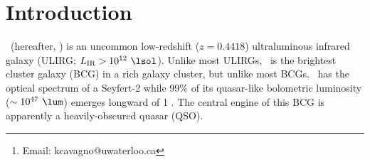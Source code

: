 \documentclass[useAMS,usenatbib]{mn2e}
\title[\mystitle]{\mytitle}
\author[Cavagnolo et al.]{K. W. Cavagnolo$^{1,2}$\thanks{Email:
    kcavagno@uwaterloo.ca}, M. Donahue$^{2}$, G. M. Voit$^{2}$,
  B. R. McNamara$^{1,3,4}$, and M. Sun$^{5}$\\
  $^{1}$University of Waterloo, Waterloo, ON, N2L 3G1, Canada.\\
  $^{2}$Michigan State University, East Lansing, MI, 48824, USA.\\
  $^{3}$Perimeter Institute for Theoretical Physics, 31 Caroline St. N., Waterloo, ON, N2L 2Y5, Canada.\\
  $^{4}$Harvard-Smithsonian Center for Astrophysics, 60 Garden Street, Cambridge, MA, 02138, USA.\\
  $^{5}$University of Virginia, Charlottesville, VA, 22904, USA.}
\begin{document}
\date{Accepted (2010 Month Day). Received (2010 Month Day); in
  original form (2010 Month Day)}

\pagerange{\pageref{firstpage}--\pageref{lastpage}} 

\maketitle

\label{firstpage}


\begin{abstract}
  We present a detailed study of the hyperluminous infrared brightest
  cluster galaxy \iras\ using a deep \chandra\ X-ray observation. %
\end{abstract}


\begin{keywords}
  \mykeywords
\end{keywords}

\section{Introduction}
\label{sec:intro}

\iras\ (hereafter, \irs) is an uncommon low-redshift ($z = 0.4418$)
ultraluminous infrared galaxy (ULIRG; $L_{\mathrm{IR}} > 10^{12}
~\lsol$). Unlike most ULIRGs, \irs\ is the brightest cluster galaxy
(BCG) in a rich galaxy cluster, but unlike most BCGs, \irs\ has the
optical spectrum of a Seyfert-2 while 99\% of its quasar-like
bolometric luminosity ($\sim 10^{47} ~\lum$) emerges longward of 1
\mymicron \citep{1988ApJ...328..161K, 1993ApJ...415...82H,
  1994ApJ...436L..51F, 1998ApJ...506..205E, 2000A&A...353..910F,
  2001MNRAS.321L..15I}. The central engine of this BCG is apparently a
heavily-obscured quasar (QSO).
\end{document}
